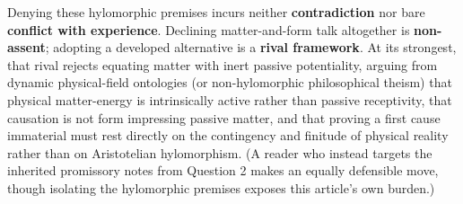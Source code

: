 Denying these hylomorphic premises incurs neither \textbf{contradiction} nor bare \textbf{conflict with experience}. Declining matter-and-form talk altogether is \textbf{non-assent}; adopting a developed alternative is a \textbf{rival framework}. At its strongest, that rival rejects equating matter with inert passive potentiality, arguing from dynamic physical-field ontologies (or non-hylomorphic philosophical theism) that physical matter-energy is intrinsically active rather than passive receptivity, that causation is not form impressing passive matter, and that proving a first cause immaterial must rest directly on the contingency and finitude of physical reality rather than on Aristotelian hylomorphism. (A reader who instead targets the inherited promissory notes from Question 2 makes an equally defensible move, though isolating the hylomorphic premises exposes this article's own burden.)
